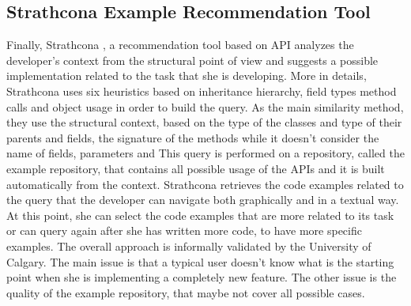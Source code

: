 \subsection{Strathcona Example Recommendation Tool}
Finally, Strathcona \cite{DBLP:conf/sigsoft/HolmesWM05}, a recommendation tool based on API analyzes the developer's context from the structural point of view and suggests a possible implementation related to the task that she is developing. More in details, Strathcona uses six heuristics based on inheritance hierarchy, field types method calls and object usage in order to build the query. As the main similarity method, they use the structural context, based on the type of the classes and  type of their parents and fields, the signature of the methods while it doesn't consider the name of fields, parameters and 
This query is performed on a repository, called the example repository, that contains all possible usage of the APIs and it is built automatically from the context. Strathcona retrieves the code examples related to the query that the developer can navigate both graphically and in a textual way. At this point, she can select the code examples that are more related to its task or can query again after she has written more code, to have more specific examples. The overall approach is informally validated by the University of Calgary. The main issue is that a typical user doesn't know what is the starting point when she is implementing a completely new feature. The other issue is the quality of the example repository, that maybe not cover all possible cases. 





